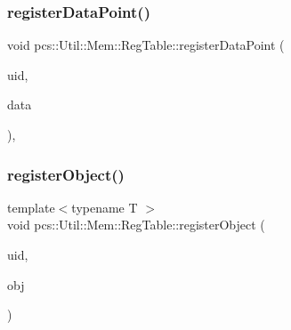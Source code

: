 \subsubsection{\texorpdfstring{register\+Data\+Point()}{registerDataPoint()}}
{\footnotesize\ttfamily void pcs\+::\+Util\+::\+Mem\+::\+Reg\+Table\+::register\+Data\+Point (\begin{DoxyParamCaption}\item[{\hyperlink{namespacepcs_1_1Util_1_1Mem_ab390aefcd13d26db4db397b784b4b9c6}{U64}}]{uid,  }\item[{\hyperlink{structpcs_1_1Util_1_1Mem_1_1DataPoint}{Data\+Point}}]{data }\end{DoxyParamCaption})\hspace{0.3cm}{\ttfamily [inline]}, {\ttfamily [private]}}

\mbox{\label{classpcs_1_1Util_1_1Mem_1_1RegTable_a3e527aef5808d02522f2e1ab27fb6947}} 
\subsubsection{\texorpdfstring{register\+Object()}{registerObject()}\hspace{0.1cm}{\footnotesize\ttfamily [1/2]}}
{\footnotesize\ttfamily template$<$typename T $>$ \\
void pcs\+::\+Util\+::\+Mem\+::\+Reg\+Table\+::register\+Object (\begin{DoxyParamCaption}\item[{\hyperlink{namespacepcs_1_1Util_1_1Mem_ab390aefcd13d26db4db397b784b4b9c6}{U64}}]{uid,  }\item[{const T $\ast$}]{obj }\end{DoxyParamCaption})\hspace{0.3cm}{\ttfamily [inline]}}

\mbox{\label{classpcs_1_1Util_1_1Mem_1_1RegTable_a7a6caf2a5c20e8b28a8f454cc91aa96e}} 
